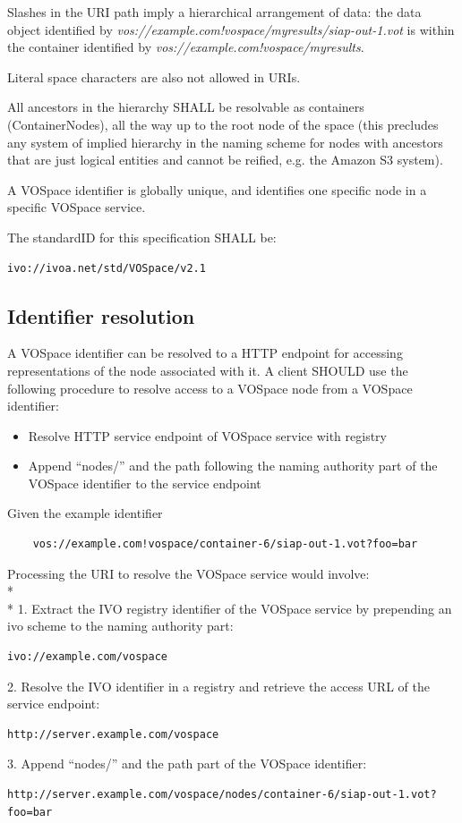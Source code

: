 \documentclass[11pt,a4paper]{ivoa}
\begin{document}
Slashes in the URI path imply a hierarchical arrangement of data: the data object identified by \emph{vos://example.com!vospace/myresults/siap-out-1.vot} is within the container identified by \emph{vos://example.com!vospace/myresults}.

Literal space characters are also not allowed in URIs.

All ancestors in the hierarchy SHALL be resolvable as containers (ContainerNodes), all the way up to the root node of the space (this precludes any system of implied hierarchy in the naming scheme for nodes with ancestors that are just logical entities and cannot be reified, e.g. the Amazon S3 system).

A VOSpace identifier is globally unique, and identifies one specific node in a specific VOSpace service.

The standardID for this specification SHALL be:
\begin{verbatim}
ivo://ivoa.net/std/VOSpace/v2.1
\end{verbatim}

\subsection{Identifier resolution}
\label{subsec:identifier resolution}
A VOSpace identifier can be resolved to a HTTP endpoint for accessing representations of the node associated with it. A client SHOULD use the following procedure to resolve access to a VOSpace node from a VOSpace identifier:

\begin{itemize}
    \item Resolve HTTP service endpoint of VOSpace service with registry
    \item Append ``nodes/'' and the path following the naming authority part of the VOSpace identifier to the service endpoint
\end{itemize}

\noindent
Given the example identifier

\begin{verbatim}
    vos://example.com!vospace/container-6/siap-out-1.vot?foo=bar
\end{verbatim}

\noindent
Processing the URI to resolve the VOSpace service would involve:
\\* \\*
1.  Extract the IVO registry identifier of the VOSpace service by prepending an ivo scheme to the naming authority part:
\begin{verbatim}
ivo://example.com/vospace
\end{verbatim}
2.  Resolve the IVO identifier in a registry and retrieve the access URL of the service endpoint:
\begin{verbatim}
http://server.example.com/vospace
\end{verbatim}
3.  Append ``nodes/'' and the path part of the VOSpace identifier:
\begin{verbatim}
http://server.example.com/vospace/nodes/container-6/siap-out-1.vot?foo=bar
\end{verbatim}
\end{document}
